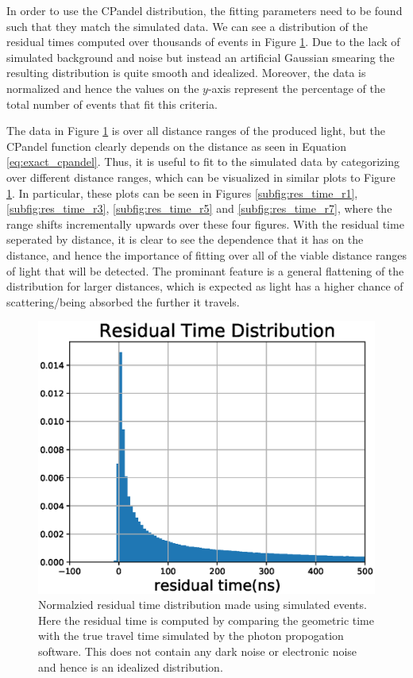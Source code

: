 In order to use the CPandel distribution, the fitting parameters need to be found such that they match the simulated data. We can see a distribution of the residual times computed over thousands of events in Figure \ref{fig:sim_restime}. Due to the lack of simulated background and noise but instead an artificial Gaussian smearing the resulting distribution is quite smooth and idealized. Moreover, the data is normalized and hence the values on the $y$-axis represent the percentage of the total number of events that fit this criteria.

The data in Figure \ref{fig:sim_restime} is over all distance ranges of the produced light, but the CPandel function clearly depends on the distance as seen in Equation \ref{eq:exact_cpandel}. Thus, it is useful to fit to the simulated data by categorizing over different distance ranges, which can be visualized in similar plots to Figure \ref{fig:sim_restime}. In particular, these plots can be seen in Figures \ref{subfig:res_time_r1}, \ref{subfig:res_time_r3}, \ref{subfig:res_time_r5} and \ref{subfig:res_time_r7}, where the range shifts incrementally upwards over these four figures. With the residual time seperated by distance, it is clear to see the dependence that it has on the distance, and hence the importance of fitting over all of the viable distance ranges of light that will be detected. The prominant feature is a general flattening of the distribution for larger distances, which is expected as light has a higher chance of scattering/being absorbed the further it travels. 

\begin{figure}[H]
  \centering
  \includegraphics[width=12cm]{./Figures/reco_plots/residual_time_histogram.eps}
  \caption{Normalzied residual time distribution made using simulated events. Here the residual time is computed by comparing the geometric time with the true travel time simulated by the photon propogation software. This does not contain any dark noise or electronic noise and hence is an idealized distribution.}
  \label{fig:sim_restime}
\end{figure}


